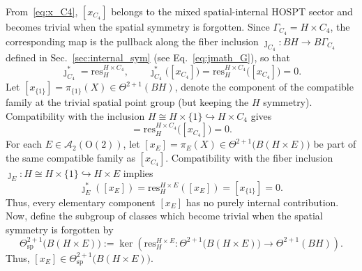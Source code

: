 \documentclass[aps,prx,reprint,superscriptaddress,twocolumn,amsmath,amssymb,amsfonts, nofootinbib]{revtex4-2}
\newcommand{\res}{\text{res}}
\theoremstyle{apsstyle}
\begin{document}
From~\eqref{eq:x_C4}, $[x_{C_4}]$ belongs to the mixed spatial-internal HOSPT sector and becomes trivial when the spatial symmetry is forgotten. Since $\Gamma_{C_4}=H\times C_4$, the corresponding map is the pullback along the fiber inclusion $\jmath_{C_4}:BH\to B\Gamma_{C_4}$ defined in Sec.~\ref{sec:internal_sym} (see Eq.~\ref{eq:jmath_G}), so that
\begin{equation*}
\jmath_{C_4}^*= \res^{H\times C_4}_{H},
\qquad \jmath_{C_4}^*\bigl([x_{C_4}]\bigr)=\res^{H\times C_4}_{H}\bigl([x_{C_4}]\bigr)=0.
\end{equation*}
Let $[x_{\{1\}}]=\pi_{\{1\}}(X)\in\Theta^{2+1}(BH)$, denote the component of the compatible family at the trivial spatial point group (but keeping the $H$ symmetry). Compatibility with the inclusion $H\cong H\times\{1\}\hookrightarrow H\times C_4$ gives
\begin{equation*}
[x_{\{1\}}] = \res^{H\times C_4}_{H}\bigl([x_{C_4}]\bigr) = 0.
\end{equation*} For each $E\in\mathcal A_2(\mathrm O(2))$, let $[x_E]=\pi_E(X) \in \Theta^{2+1}\bigl(B(H\times E)\bigr)$ be part of the same compatible family as $[x_{C_4}].$ 
Compatibility with the fiber inclusion $\jmath_{E}:H\cong H\times\{1\}\hookrightarrow H\times E$ implies
\begin{equation}
\jmath_E^*([x_E])
=\res^{H\times E}_{H}([x_E])=[x_{\{1\}}]=0.
\label{eq:HOSPT_elementary_no_internal}
\end{equation}
Thus, every elementary component $[x_E]$ has no purely internal contribution. Now, define the subgroup of classes which become trivial when the spatial symmetry is forgotten by 
\begin{equation*}
\Theta^{2+1}_{\mathrm{sp}}\bigl(B(H\times E)\bigr) :=
\ker\left( \res^{H\times E}_{H}: \Theta^{2+1}\bigl(B(H\times E)\bigr)
\to \Theta^{2+1}(BH) \right).
\end{equation*} Thus, $[x_E]\in\Theta^{2+1}_{\mathrm{sp}}\bigl(B(H\times E)\bigr)$. 

\medskip 
\end{document}
